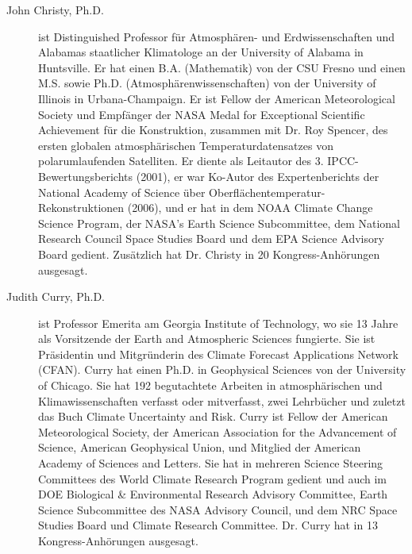 \documentclass[12pt,paper=a4,DIV=12,parskip=never,chapterprefix=false,headings=standardclasses]{scrreprt}
\begin{document}
\begin{description}
  \item[John Christy, Ph.D.] ist Distinguished Professor für Atmosphären- und Erdwissenschaften und Alabamas staatlicher Klimatologe an der University of Alabama in Huntsville. Er hat einen B.A. (Mathematik) von der CSU Fresno und einen M.S. sowie Ph.D. (Atmosphärenwissenschaften) von der University of Illinois in Urbana-Champaign. Er ist Fellow der American Meteorological Society und Empfänger der NASA Medal for Exceptional Scientific Achievement für die Konstruktion, zusammen mit Dr. Roy Spencer, des ersten globalen atmosphärischen Temperaturdatensatzes von polarumlaufenden Satelliten. Er diente als Leitautor des 3. IPCC-Bewertungsberichts (2001), er war Ko-Autor des Expertenberichts der National Academy of Science über Oberflächentemperatur-Rekonstruktionen (2006), und er hat in dem NOAA Climate Change Science Program, der NASA's Earth Science Subcommittee, dem National Research Council Space Studies Board und dem EPA Science Advisory Board gedient. Zusätzlich hat Dr. Christy in 20 Kongress-Anhörungen ausgesagt.
  \item[Judith Curry, Ph.D.] ist Professor Emerita am Georgia Institute of Technology, wo sie 13 Jahre als Vorsitzende der Earth and Atmospheric Sciences fungierte. Sie ist Präsidentin und Mitgründerin des Climate Forecast Applications Network (CFAN). Curry hat einen Ph.D. in Geophysical Sciences von der University of Chicago. Sie hat 192 begutachtete Arbeiten in atmosphärischen und Klimawissenschaften verfasst oder mitverfasst, zwei Lehrbücher und zuletzt das Buch Climate Uncertainty and Risk. Curry ist Fellow der American Meteorological Society, der American Association for the Advancement of Science, American Geophysical Union, und Mitglied der American Academy of Sciences and Letters. Sie hat in mehreren Science Steering Committees des World Climate Research Program gedient und auch im DOE Biological \& Environmental Research Advisory Committee, Earth Science Subcommittee des NASA Advisory Council, und dem NRC Space Studies Board und Climate Research Committee. Dr. Curry hat in 13 Kongress-Anhörungen ausgesagt.

\end{description}
\end{document}
